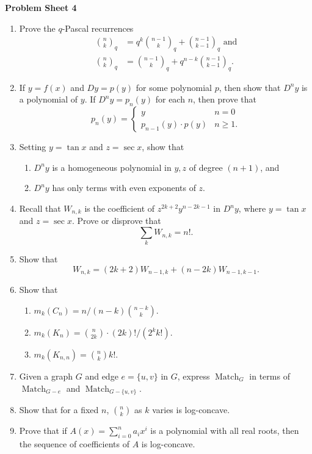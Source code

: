 \documentclass{article}
\title{\topicname}
\author{\myname}
\date{}
\newcommand{\Match}{\operatorname{Match}}
\begin{document}
\thispagestyle{empty}



% 
% 
% 

\textbf{\Large Problem Sheet 4}

\begin{enumerate}

	\item Prove the $q$-Pascal recurrences
	\begin{align*}
		\binom{n}{k}_q &= q^k \binom{n-1}{k}_q + \binom{n-1}{k-1}_q \text{ and} \\
		\binom{n}{k}_q &= \binom{n-1}{k}_q + q^{n-k} \binom{n-1}{k-1}_q .
	\end{align*}

	\item If $y = f(x)$ and $Dy = p(y)$ for some polynomial $p$, then show that $D^n y$ is a polynomial of $y$. If $D^n y = p_n(y)$ for each $n$, then prove that
	\[ p_n(y) = \begin{cases} y & n=0 \\ p_{n-1}(y) \cdot p(y) & n \ge 1. \end{cases} \]
	
	\item Setting $y = \tan x$ and $z = \sec x$, show that
	\begin{enumerate}
		\item $D^ny$ is a homogeneous polynomial in $y,z$ of degree $(n+1)$, and
		\item $D^ny$ has only terms with even exponents of $z$.
	\end{enumerate}	

	\item Recall that $W_{n,k}$ is the coefficient of $z^{2k+2}y^{n-2k-1}$ in $D^ny$, where $y = \tan x$ and $z = \sec x$. Prove or disprove that
	\[ \sum_k W_{n,k} = n!. \]

	\item Show that
	\[ W_{n,k} = (2k+2) W_{n-1,k} + (n-2k) W_{n-1,k-1}. \]

	\item Show that
	\begin{enumerate}
		\item $m_k(C_n) = n/(n-k) \binom{n-k}{k}$.
		\item $m_k(K_n) = \binom{n}{2k} \cdot (2k)!/(2^k k!)$.
		\item $m_k(K_{n,n}) = \binom{n}{k} k!$.
	\end{enumerate}

	\item Given a graph $G$ and edge $e = \{u,v\}$ in $G$, express $\Match_G$ in terms of $\Match_{G-e}$ and $\Match_{G-\{u,v\}}$.

	\item Show that for a fixed $n$, $\binom{n}{k}$ as $k$ varies is log-concave.

	\item Prove that if $A(x) = \sum_{i=0}^n a_i x^i$ is a polynomial with all real roots, then the sequence of coefficients of $A$ is log-concave.

\end{enumerate}
\end{document}
